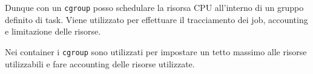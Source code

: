 Dunque con un \passthrough{\lstinline!cgroup!} posso schedulare la
risorsa CPU all'interno di un gruppo definito di task. Viene utilizzato
per effettuare il tracciamento dei job, accounting e limitazione delle
risorse.

Nei container i \passthrough{\lstinline!cgroup!} sono utilizzati per
impostare un tetto massimo alle risorse utilizzabili e fare accounting
delle risorse utilizzate.

